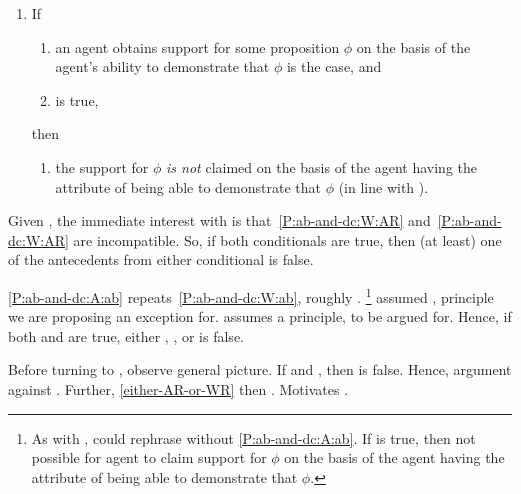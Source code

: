 \begin{note}[Conditional B]
  \begin{proposition}[\mcB{}]
    \begin{enumerate}[label=(C\Alph*), ref=(C\Alph*), resume*=CC_counter]
    \item\label{P:ab-and-dc:A} If
      \begin{enumerate}[label=(\roman*), ref=(CB.\roman*), series=CCB_counter]
      \item\label{P:ab-and-dc:A:ab} an agent obtains support for some proposition \(\phi\) on the basis of the agent's ability to demonstrate that \(\phi\) is the case, and
      \item\label{P:ab-and-dc:A:ni} \nI{} is true,
      \end{enumerate}
      then
      \begin{enumerate}[label=(\roman*), ref=(CB.\roman*), resume*=CCB_counter]
      \item\label{P:ab-and-dc:A:AR} the support for \(\phi\) \emph{is not} claimed on the basis of the agent having the attribute of being able to demonstrate that \(\phi\) (in line with \AR{}).
      \end{enumerate}
    \end{enumerate}
    \vspace{-\topsep}
  \end{proposition}
\end{note}

\begin{note}
  Given \mcA{}, the immediate interest with \mcB{} is that~\ref{P:ab-and-dc:W:AR} and~\ref{P:ab-and-dc:W:AR} are incompatible.
  So, if both conditionals are true, then (at least) one of the antecedents from either conditional is false.

  \ref{P:ab-and-dc:A:ab} repeats~\ref{P:ab-and-dc:W:ab}, roughly \eA{}.\nolinebreak
  \footnote{
    As with \mcA{}, could rephrase without \ref{P:ab-and-dc:A:ab}.
    If \nI{} is true, then not possible for agent to claim support for \(\phi\) on the basis of the agent having the attribute of being able to demonstrate that \(\phi\).
  }
  \mcA{} assumed \ESU{}, principle we are proposing an exception for.
  \mcB{} assumes a principle, \nI{} to be argued for.
  Hence, if both \mcA{} and \mcB{} are true, either \eA{}, \ESU{}, or \nI{} is false.

  Before turning to \nI{}, observe general picture.
  If \eA{} and \nI{}, then \ESU{} is false.
  Hence, argument against \ESU{}.
  Further, \ref{either-AR-or-WR} then \WR{}.
  Motivates \EAS{}.
\end{note}



